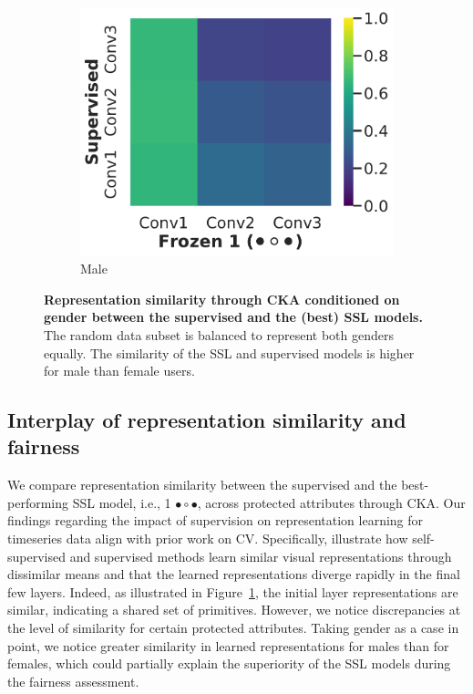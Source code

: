 \documentclass[letterpaper]{article} %
\begin{document}
\begin{figure}
\begin{subfigure}[]{0.35\linewidth}
    \includegraphics[trim={3cm 0.4cm 0 0},clip,width=\linewidth]{img/supervised-frozen1m-cka-male.pdf}
    \caption{Male}
\end{subfigure} %
\caption{\textbf{Representation similarity through CKA conditioned on gender between the supervised and the (best) SSL models.} The random data subset is balanced to represent both genders equally. The similarity of the SSL and supervised models is higher for male than female users.}
\label{ckaconditionedgender}
\vspace{-0.4cm}
\end{figure}
\subsection{Interplay of representation similarity and fairness}\label{representation-evaluation}
We compare representation similarity between the supervised and the best-performing SSL model, i.e., 1 $\bullet\circ\bullet$, across protected attributes through CKA. Our findings regarding the impact of supervision on representation learning for timeseries data align with prior work on CV. Specifically, \citet{grigg2021self} illustrate how self-supervised and supervised methods learn similar visual representations through dissimilar means and that the learned representations diverge rapidly in the final few layers. Indeed, as illustrated in Figure~\ref{ckaconditionedgender}, the initial layer representations are similar, indicating a shared set of primitives. However, we notice discrepancies at the level of similarity for certain protected attributes. Taking gender as a case in point, we notice greater similarity in learned representations for males than for females, which could partially explain the superiority of the SSL models during the fairness assessment.
\end{document}
